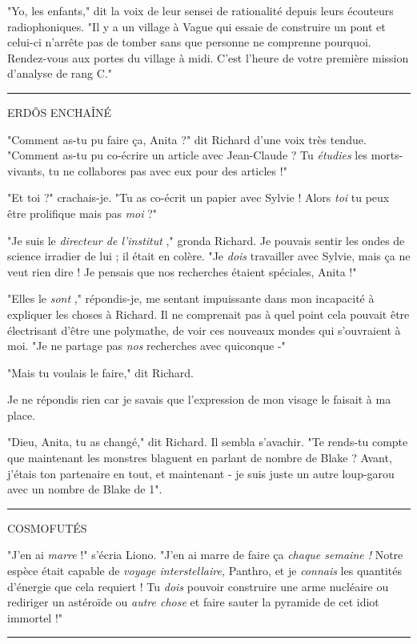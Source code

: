 "Yo, les enfants," dit la voix de leur sensei de rationalité depuis leurs écouteurs radiophoniques. "Il y a un village à Vague qui essaie de construire un pont et celui-ci n'arrête pas de tomber sans que personne ne comprenne pourquoi. Rendez-vous aux portes du village à midi. C'est l'heure de votre première mission d'analyse de rang C."
\par\noindent\rule{\textwidth}{0.4pt}

\begin{center}ERDÕS ENCHAÎNÉ\end{center}


"Comment as-tu pu faire ça, Anita ?" dit Richard d'une voix très tendue. "Comment as-tu pu co-écrire un article avec Jean-Claude ? Tu \emph{étudies}  les morts-vivants, tu ne collabores pas avec eux pour des articles !"

"Et toi ?" crachais-je. "Tu as co-écrit un papier avec Sylvie ! Alors \emph{toi}  tu peux être prolifique mais pas \emph{moi}  ?"

"Je suis le \emph{directeur de l'institut} ," gronda Richard. Je pouvais sentir les ondes de science irradier de lui ; il était en colère. "Je \emph{dois}  travailler avec Sylvie, mais ça ne veut rien dire ! Je pensais que nos recherches étaient spéciales, Anita !"

"Elles le \emph{sont} ," répondis-je, me sentant impuissante dans mon incapacité à expliquer les choses à Richard. Il ne comprenait pas à quel point cela pouvait être électrisant d'être une polymathe, de voir ces nouveaux mondes qui s'ouvraient à moi. "Je ne partage pas \emph{nos}  recherches avec quiconque -"

"Mais tu voulais le faire," dit Richard.

Je ne répondis rien car je savais que l'expression de mon visage le faisait à ma place.

"Dieu, Anita, tu as changé," dit Richard. Il sembla s'avachir. "Te rends-tu compte que maintenant les monstres blaguent en parlant de nombre de Blake ? Avant, j'étais ton partenaire en tout, et maintenant - je suis juste un autre loup-garou avec un nombre de Blake de 1".
\par\noindent\rule{\textwidth}{0.4pt}

\begin{center}COSMOFUTÉS\end{center}


"J'en ai \emph{marre}  !" s'écria Liono. "J'en ai marre de faire ça \emph{chaque semaine !}  Notre espèce était capable de \emph{voyage interstellaire, } Panthro, et je \emph{connais}  les quantités d'énergie que cela requiert ! Tu \emph{dois}  pouvoir construire une arme nucléaire ou rediriger un astéroïde ou \emph{autre chose}  et faire sauter la pyramide de cet idiot immortel !"
\par\noindent\rule{\textwidth}{0.4pt}

